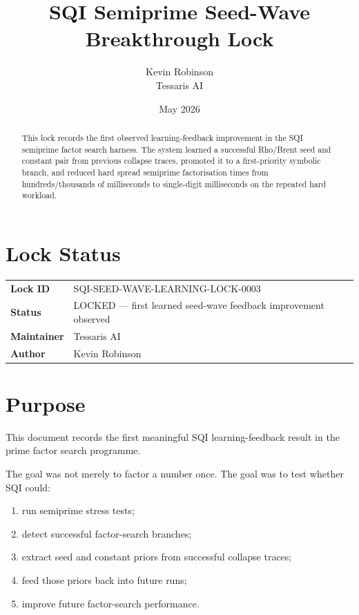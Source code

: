 \documentclass[11pt,a4paper]{article}
\title{\textbf{SQI Semiprime Seed-Wave Breakthrough Lock}}
\author{Kevin Robinson \\ Tessaris AI}
\date{May 2026}
\begin{document}
\maketitle

\begin{abstract}
This lock records the first observed learning-feedback improvement in the SQI semiprime
factor search harness. The system learned a successful Rho/Brent seed and constant pair
from previous collapse traces, promoted it to a first-priority symbolic branch, and reduced
hard spread semiprime factorisation times from hundreds/thousands of milliseconds to
single-digit milliseconds on the repeated hard workload.
\end{abstract}

\section{Lock Status}

\begin{tabularx}{\textwidth}{@{}lX@{}}
\textbf{Lock ID} & SQI-SEED-WAVE-LEARNING-LOCK-0003 \\
\textbf{Status} & LOCKED --- first learned seed-wave feedback improvement observed \\
\textbf{Maintainer} & Tessaris AI \\
\textbf{Author} & Kevin Robinson \\
\end{tabularx}

\section{Purpose}

This document records the first meaningful SQI learning-feedback result in the prime factor
search programme.

The goal was not merely to factor a number once. The goal was to test whether SQI could:

\begin{enumerate}
  \item run semiprime stress tests;
  \item detect successful factor-search branches;
  \item extract seed and constant priors from successful collapse traces;
  \item feed those priors back into future runs;
  \item improve future factor-search performance.
\end{enumerate}
\end{document}
